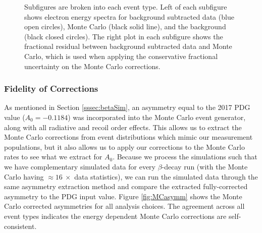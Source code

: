 \begin{figure}[p]
  \caption{Subfigures are broken into each event type.
    Left of each subfigure shows electron energy spectra for background subtracted data (blue open circles),
    Monte Carlo (black solid line), and the background (black closed circles). The right plot in each
    subfigure shows the fractional residual between background subtracted data and Monte Carlo, which is used
    when applying the conservative fractional uncertainty on the Monte Carlo corrections.}
  \label{fig:fracResid}
\end{figure}

\subsubsection{Fidelity of Corrections}

As mentioned in Section \ref{sssec:betaSim}, an asymmetry equal to the
2017 PDG value ($A_0=-0.1184$) was incorporated into the Monte Carlo
event generator, along with all radiative and recoil order effects. This allows
us to extract the Monte Carlo corrections from event distributions which mimic
our measurement populations, but it also allows us to apply our corrections
to the Monte Carlo rates to see what we extract for $A_0$. Because we process
the simulations such that we have complementary simulated data for every
$\beta$-decay run (with the Monte Carlo having $\approx 16~\times$ data statistics),
we can run the simulated data through the same asymmetry extraction method and compare
the extracted fully-corrected asymmetry to the PDG input value. Figure \ref{fig:MCasymm}
shows the Monte Carlo corrected asymmetries for all analysis choices. The agreement across
all event types indicates the energy dependent Monte Carlo corrections are self-consistent.

